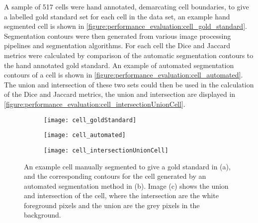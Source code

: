 A sample of 517 cells were hand annotated, demarcating cell boundaries, to give a labelled gold standard set for each cell in the data set, an example hand segmented cell is shown in \autoref{figure:performance_evaluation:cell_gold_standard}. Segmentation contours were then generated from various image processing pipelines and segmentation algorithms. For each cell the Dice and Jaccard metrics were calculated by comparison of the automatic segmentation contours to the hand annotated gold standard. An example of automated segmentation contours of a cell is shown in \autoref{figure:performance_evaluation:cell_automated}. The union and intersection of these two sets could then be used in the calculation of the Dice and Jaccard metrics, the union and intersection are displayed in \autoref{figure:performance_evaluation:cell_intersectionUnionCell}.

\begin{figure}[htbp]\centering
	\begin{subfigure}[b]{0.32\linewidth}
		\centering
		\texttt{[image: cell\_goldStandard]}
		\caption{}
		\label{figure:performance_evaluation:cell_gold_standard}
		\vspace{1ex}
	\end{subfigure}
	\begin{subfigure}[b]{0.32\linewidth}
		\centering
		\texttt{[image: cell\_automated]}
		\caption{}
		\label{figure:performance_evaluation:cell_automated}
		\vspace{1ex}
	\end{subfigure}
	\begin{subfigure}[b]{0.32\linewidth}
		\centering
		\texttt{[image: cell\_intersectionUnionCell]}
		\caption{}
		\label{figure:performance_evaluation:cell_intersectionUnionCell}
		\vspace{1ex}
	\end{subfigure}
\caption[Cell: gold standard contours, automated contours, and union and intersection]{An example cell manually segmented to give a gold standard in (a), and the corresponding contours for the cell generated by an automated segmentation method in (b). Image (c) shows the union and intersection of the cell, where the intersection are the white foreground pixels and the union are the grey pixels in the background.}
\label{figure:performance_evaluation:cell}
\end{figure}

